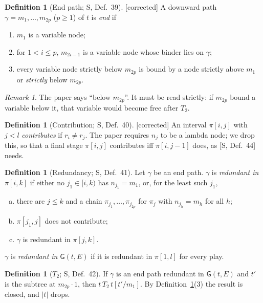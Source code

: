 \documentclass[11pt]{article}
\newcommand{\Gm}{\mathsf{G}}
\newcommand{\suc}[2]{#1{\cdot}#2}
\newcommand{\iv}[2]{\pi[#1,#2]}
\newcommand{\Fixed}{\textsf{[corrected]}}
\theoremstyle{plain}
\theoremstyle{definition}
\newtheorem{definition}[theorem]{Definition}
\theoremstyle{remark}
\newtheorem{remark}[theorem]{Remark}
\begin{document}
\begin{definition}[End path; S, Def.~39]\label{def:endpath}
\Fixed{} A downward path $\gamma=m_1,\dots,m_{2p}$ ($p\ge1$) of $t$ is
\emph{end} if
\begin{enumerate}
\item $m_1$ is a variable node;
\item for $1<i\le p$, $m_{2i-1}$ is a variable node whose binder lies on
  $\gamma$;
\item every variable node strictly below $m_{2p}$ is bound by a node
  strictly above $m_1$ or \emph{strictly} below $m_{2p}$.
\end{enumerate}
\end{definition}

\begin{remark}
The paper says ``below $m_{2p}$''.  It must be read strictly: if
$m_{2p}$ bound a variable below it, that variable would become free after
$T_2$.
\end{remark}

\begin{definition}[Contribution; S, Def.~40]\label{def:contrib}
\Fixed{} An interval $\iv ij$ with $j<l$ \emph{contributes} if
$r_i\ne r_j$.  The paper requires $n_j$ to be a lambda node; we drop
this, so that a final stage $\iv ij$ contributes iff $\iv i{j-1}$ does,
as [S, Def.~44] needs.
\end{definition}

\begin{definition}[Redundancy; S, Def.~41]\label{def:redundant}
Let $\gamma$ be an end path.  $\gamma$ is \emph{redundant in} $\iv ik$ if
either no $j_1\in[i,k)$ has $n_{j_1}=m_1$, or, for the least such $j_1$,
\begin{enumerate}[(a)]
\item there are $j\le k$ and a chain $\pi_{j_1},\dots,\pi_{j_{2p}}$ for
  $\pi_j$ with $n_{j_h}=m_h$ for all $h$;
\item $\iv{j_1}j$ does not contribute;
\item $\gamma$ is redundant in $\iv jk$.
\end{enumerate}
$\gamma$ is \emph{redundant in} $\Gm(t,E)$ if it is redundant in $\iv1l$
for every play.
\end{definition}

\begin{definition}[$T_2$; S, Def.~42]
If $\gamma$ is an end path redundant in $\Gm(t,E)$ and $t'$ is the
subtree at $\suc{m_{2p}}1$, then $t\,T_2\,t[t'/m_1]$.  By
Definition~\ref{def:endpath}(3) the result is closed, and $|t|$ drops.
\end{definition}
\end{document}
